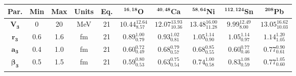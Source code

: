 \bgroup
\def\arraystretch{1.5}%
\begin{tabular}{ c c c c c c c c c c} 
\textbf{Par.} & \textbf{Min} & \textbf{Max} &                \textbf{Units} & \textbf{Eq.}& \textbf{$\mathbf{^{16,18}}$O}& \textbf{$\mathbf{^{40,48}}$Ca}& \textbf{$\mathbf{^{58,64}}$Ni}& \textbf{$\mathbf{^{112,124}}$Sn}& \textbf{$\mathbf{^{208}}$Pb}\\
 \hline 
$\mathbf{V_{3}}$ & 0 & 20 & MeV & 21 & $10.44^{12.64}_{8.57}$ & $12.07^{13.93}_{10.36}$ & $13.48^{16.00}_{11.28}$ & $9.99^{12.49}_{8.00}$ & $13.05^{16.62}_{10.03}$\\ 
$\mathbf{r_{3}}$ & 0.6 & 1.6 & fm & 21 & $0.89^{1.00}_{0.79}$ & $0.93^{1.02}_{0.81}$ & $1.05^{1.14}_{0.90}$ & $1.05^{1.14}_{0.97}$ & $1.14^{1.20}_{1.05}$\\ 
$\mathbf{a_{3}}$ & 0.4 & 1.0 & fm & 21 & $0.60^{0.72}_{0.49}$ & $0.68^{0.79}_{0.57}$ & $0.68^{0.85}_{0.55}$ & $0.60^{0.77}_{0.46}$ & $0.77^{0.90}_{0.61}$\\ 
$\mathbf{\beta_{3}}$ & 0.5 & 1.5 & fm & 21 & $0.59^{0.80}_{0.53}$ & $0.63^{0.75}_{0.54}$ & $0.74^{1.00}_{0.58}$ & $0.83^{1.08}_{0.59}$ & $0.77^{1.05}_{0.60}$\\ 
\\ 
\end{tabular}
\egroup